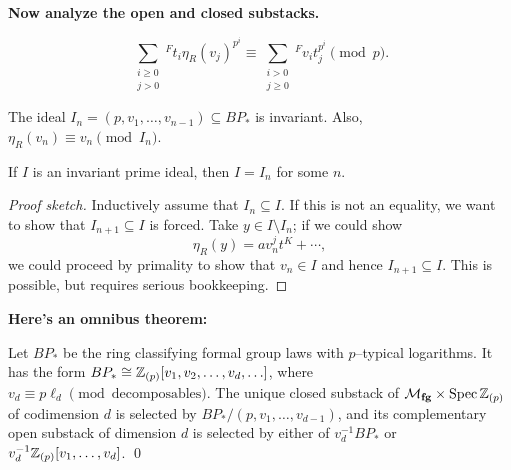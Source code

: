 

\textbf{Now analyze the open and closed substacks.}

\begin{lemma}
\[\sum_{\substack{i \ge 0 \\ j > 0}}{}^F t_i \eta_R(v_j)^{p^i} \equiv \sum_{\substack{i > 0 \\ j \ge 0}}{}^F v_i t_j^{p^i} \pmod p.\]
\end{lemma}

\begin{corollary}
The ideal $I_n = (p, v_1, \ldots, v_{n-1}) \subseteq BP_*$ is invariant.  Also, $\eta_R(v_n) \equiv v_n \pmod{I_n}$.
\end{corollary}

\begin{theorem}
If $I$ is an invariant prime ideal, then $I = I_n$ for some $n$.
\end{theorem}
\begin{proof}[Proof sketch]
Inductively assume that $I_n \subseteq I$.  If this is not an equality, we want to show that $I_{n+1} \subseteq I$ is forced.  Take $y \in I \setminus I_n$; if we could show \[\eta_R(y) = a v_n^j t^K + \cdots,\] we could proceed by primality to show that $v_n \in I$ and hence $I_{n+1} \subseteq I$.  This is possible, but requires serious bookkeeping.
\end{proof}

\textbf{Here's an omnibus theorem:}

\begin{theorem}
Let $BP_*$ be the ring classifying formal group laws with $p$--typical logarithms.  It has the form $BP_* \cong \mathbb Z_{(p)}[v_1, v_2, \ldots, v_d, \ldots]$, where $v_d \equiv p \ell_d \pmod{\text{decomposables}}$.  The unique closed substack of $\mathcal{M}_{\mathbf{fg}} \times \operatorname{Spec} \mathbb Z_{(p)}$ of codimension $d$ is selected by $BP_* / (p, v_1, \ldots, v_{d-1})$, and its complementary open substack of dimension $d$ is selected by either of $v_d^{-1} BP_*$ or $v_d^{-1} \mathbb Z_{(p)}[v_1, \ldots, v_d]$. \qed
\end{theorem}

